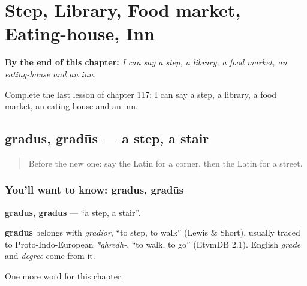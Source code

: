 
\chapter{Step, Library, Food market, Eating-house, Inn}
\label{ch:la-step-library-food-market-eating-house-inn}

\begin{chapteropening}
\textbf{By the end of this chapter:} \emph{I can say a step, a library, a food market, an eating-house and an inn.}

Complete the last lesson of chapter 117: I can say a step, a library, a food market, an eating-house and an inn.
\end{chapteropening}

\section[gradus, gradūs]{gradus, gradūs — a step, a stair}

\label{lesson:LA-C117-gradus}



\begin{quote}
Before the new one: say the Latin for a corner, then the Latin for a street.
\end{quote}

\subsection*{You'll want to know: gradus, gradūs}
\textbf{gradus, gradūs} — \textquotedblleft{}a step, a stair\textquotedblright{}.

\begin{cousinweb}
\textbf{gradus} belongs with \emph{gradior}, \textquotedblleft{}to step, to walk\textquotedblright{} (Lewis \& Short), usually traced to Proto-Indo-European \emph{*ghredh-}, \textquotedblleft{}to walk, to go\textquotedblright{} (EtymDB 2.1). English \emph{grade} and \emph{degree} come from it.
\end{cousinweb}

\begin{grammarlens}[title={What you've built}]
One more word for this chapter.
\end{grammarlens}

